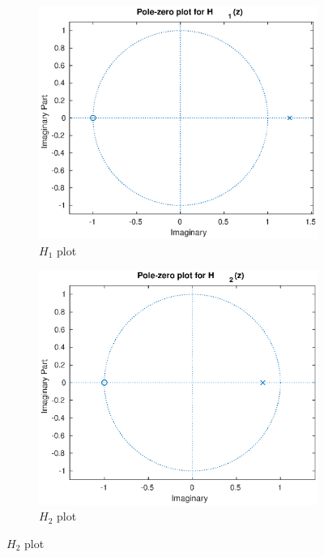 \documentclass{article}
\begin{document}
\begin{figure}[H]
	\centering
	\begin{subfigure}[b]{0.4\linewidth}
		\centering
		\includegraphics[width=\linewidth]{pzh1}
		\caption{\(H_1\) plot}
	\end{subfigure}
	\begin{subfigure}[b]{0.4\linewidth}
		\centering
		\includegraphics[width=\linewidth]{pzh2}
		\caption{\(H_2\) plot}
	\end{subfigure}
\end{figure}
\end{document}
